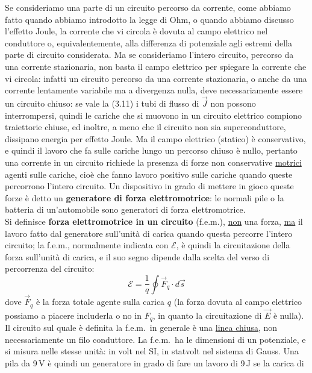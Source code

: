 Se consideriamo una parte di un circuito percorso da corrente, come abbiamo
fatto quando abbiamo introdotto la legge di Ohm, o quando abbiamo discusso
l'effetto Joule, la corrente che vi circola \`e dovuta al campo elettrico nel
conduttore o, equivalentemente, alla differenza di potenziale agli estremi della
parte di circuito considerata. Ma se consideriamo l'intero circuito, percorso da
una corrente stazionaria, non basta il campo elettrico per spiegare la corrente
che vi circola: infatti un circuito percorso da una corrente stazionaria, o
anche da una corrente lentamente variabile ma a divergenza nulla, deve
necessariamente essere un circuito chiuso: se vale la (3.11) i tubi di flusso di
$\vec J$ non possono interrompersi, quindi le cariche che si muovono in un
circuito elettrico compiono traiettorie chiuse, ed inoltre, a meno che il
circuito non sia superconduttore, dissipano energia per effetto Joule. Ma il
campo elettrico (statico) \`e conservativo, e quindi il lavoro che fa sulle
cariche lungo un percorso chiuso \`e nullo, pertanto una corrente in un circuito
richiede la presenza di forze non conservative \underline{motrici} agenti sulle
cariche, cio\`e che fanno lavoro positivo sulle cariche quando queste percorrono
l'intero circuito. Un dispositivo in grado di mettere in gioco queste forze \`e
detto un \textbf{generatore di forza elettromotrice}: le normali pile o la
batteria di un'automobile sono generatori di forza elettromotrice.\\
Si definisce \textbf{forza elettromotrice in un circuito} (f.e.m.),
\underline{non} una forza, \underline{ma} il lavoro fatto dal generatore
sull'unit\`a di carica quando questa percorre l'intero circuito; la f.e.m.,
normalmente indicata con $\mathcal E$, \`e quindi la circuitazione della forza
sull'unit\`a di carica, e il suo segno dipende dalla scelta del verso di
percorrenza del circuito:
\begin{equation}
  \mathcal E=\frac1q\oint\vec F_q\cdot d\vec s
  \tag{3.33}
\end{equation}
dove $\vec F_q$ \`e la forza totale agente sulla carica $q$ (la forza dovuta al
campo elettrico possiamo a piacere includerla o no in $F_q$, in quanto la
circuitazione di $\vec E$ \`e nulla). Il circuito sul quale \`e definita la
f.e.m.\ in generale \`e una \underline{linea chiusa}, non necessariamente un
filo conduttore. La f.e.m.\ ha le dimensioni di un potenziale, e si misura nelle
stesse unit\`a: in volt nel SI, in statvolt nel sistema di Gauss. Una pila da
9\,V \`e quindi un generatore in grado di fare un lavoro di 9\,J se la carica di
